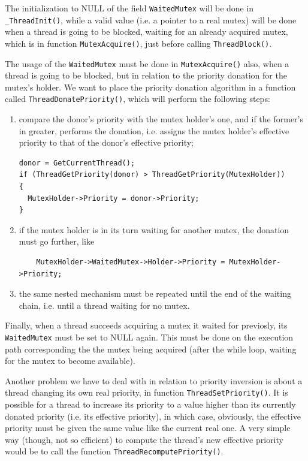 The initialization to NULL of the field \lstinline|WaitedMutex| will be done in \lstinline|_ThreadInit()|, while a valid value (i.e. a pointer to a real mutex) will be done when a thread is going to be blocked, waiting for an already acquired mutex, which is in function \lstinline|MutexAcquire()|, just before calling \lstinline|ThreadBlock()|.

The usage of the \lstinline|WaitedMutex| must be done in \lstinline|MutexAcquire()| also, when a thread is going to be blocked, but in relation to the priority donation for the mutex's holder. We want to place the priority donation algorithm in a function called \lstinline|ThreadDonatePriority()|, which will perform the following steps:
\begin{enumerate}
    \item compare the donor's priority with the mutex holder's one, and if the former's in greater, performs the donation, i.e. assigns the mutex holder's effective priority to that of the donor's effective priority;
    \begin{lstlisting}
donor = GetCurrentThread();
if (ThreadGetPriority(donor) > ThreadGetPriority(MutexHolder))
{
  MutexHolder->Priority = donor->Priority;
}
    \end{lstlisting}

    \item if the mutex holder is in its turn waiting for another mutex, the donation must go further, like
\begin{lstlisting}
    MutexHolder->WaitedMutex->Holder->Priority = MutexHolder->Priority;
\end{lstlisting}

    \item the same nested mechanism must be repeated until the end of the waiting chain, i.e. until a thread waiting for no mutex.
\end{enumerate}

Finally, when a thread succeeds acquiring a mutex it waited for previosly, its \lstinline|WaitedMutex| must be set to NULL again. This must be done on the execution path corresponding the the mutex being acquired (after the while loop, waiting for the mutex to become available).

Another problem we have to deal with in relation to priority inversion is about a thread changing its own real priority, in function \lstinline|ThreadSetPriority()|. It is possible for a thread to increase its priority to a value higher than its currently donated priority (i.e. its effective priority), in which case, obviously, the effective priority must be given the same value like the current real one. A very simple way (though, not so efficient) to compute the thread's new effective priority would be to call the function \lstinline|ThreadRecomputePriority()|.

